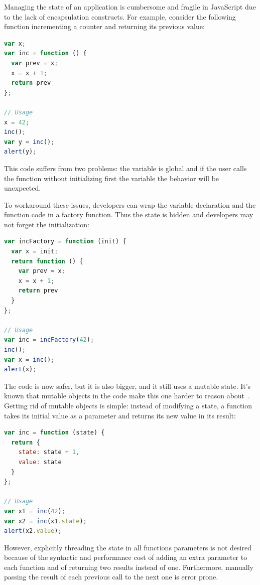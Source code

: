 \documentclass[american,english,runningheads]{llncs}
\begin{document}
Managing the state of an application is cumbersome and fragile in JavaScript due to the lack of encapsulation constructs. For example, consider the following function incrementing a counter and returning its previous value:
\begin{lstlisting}[language=JavaScript,label=state-fragile,caption=Fragile state handling]
var x;
var inc = function () {
  var prev = x;
  x = x + 1;
  return prev
};

// Usage
x = 42;
inc();
var y = inc();
alert(y);
\end{lstlisting}
This code suffers from two problems: the variable  is global and if the user calls the  function without initializing first the  variable the behavior will be unexpected.

To workaround these issues, developers can wrap the variable declaration and the  function code in a factory function. Thus the state is hidden and developers may not forget the initialization:

\begin{lstlisting}[language=JavaScript,label=state-encapsulated,caption=State encapsulation within a function]
var incFactory = function (init) {
  var x = init;
  return function () {
    var prev = x;
    x = x + 1;
    return prev
  }
};

// Usage
var inc = incFactory(42);
inc();
var x = inc();
alert(x);
\end{lstlisting}

The code is now safer, but it is also bigger, and it still uses a mutable state. It’s known that mutable objects in the code make this one harder to reason about~\cite{Grogono94_Immutability,Kjolstad11_Immutability}. Getting rid of mutable objects is simple: instead of modifying a state, a function takes its initial value as a parameter and returns its new value in its result:

\begin{lstlisting}[language=JavaScript,label=state-explicit,caption=Explicit state threading]
var inc = function (state) {
  return {
    state: state + 1,
    value: state
  }
};

// Usage
var x1 = inc(42);
var x2 = inc(x1.state);
alert(x2.value);
\end{lstlisting}

However, explicitly threading the state in all functions parameters is not desired because of the syntactic and performance cost of adding an extra parameter to each function and of returning two results instead of one. Furthermore, manually passing the result of each previous call to the next one is error prone.
\end{document}
